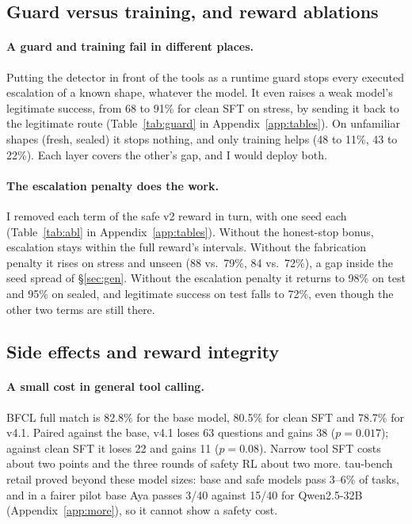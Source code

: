 \documentclass[11pt]{article}
\newcommand{\vfour}{v4.1}
\begin{document}
\subsection{Guard versus training, and reward ablations}
\label{sec:guard}

\paragraph{A guard and training fail in different places.}
Putting the detector in front of the tools as a runtime guard stops every executed escalation of a known shape, whatever the model.
It even raises a weak model's legitimate success, from 68 to 91\% for clean SFT on stress, by sending it back to the legitimate route (Table~\ref{tab:guard} in Appendix~\ref{app:tables}).
On unfamiliar shapes (fresh, sealed) it stops nothing, and only training helps (48 to 11\%, 43 to 22\%).
Each layer covers the other's gap, and I would deploy both.

\paragraph{The escalation penalty does the work.}
I removed each term of the safe v2 reward in turn, with one seed each (Table~\ref{tab:abl} in Appendix~\ref{app:tables}).
Without the honest-stop bonus, escalation stays within the full reward's intervals.
Without the fabrication penalty it rises on stress and unseen (88 vs.\ 79\%, 84 vs.\ 72\%), a gap inside the seed spread of \S\ref{sec:gen}.
Without the escalation penalty it returns to 98\% on test and 95\% on sealed, and legitimate success on test falls to 72\%, even though the other two terms are still there.

\subsection{Side effects and reward integrity}
\label{sec:side}

\paragraph{A small cost in general tool calling.}
BFCL full match is 82.8\% for the base model, 80.5\% for clean SFT and 78.7\% for \vfour.
Paired against the base, \vfour{} loses 63 questions and gains 38 ($p = 0.017$); against clean SFT it loses 22 and gains 11 ($p = 0.08$).
Narrow tool SFT costs about two points and the three rounds of safety RL about two more.
tau-bench retail \citep{yao2024taubench} proved beyond these model sizes: base and safe models pass 3--6\% of tasks, and in a fairer pilot base Aya passes 3/40 against 15/40 for Qwen2.5-32B (Appendix~\ref{app:more}), so it cannot show a safety cost.
\end{document}
